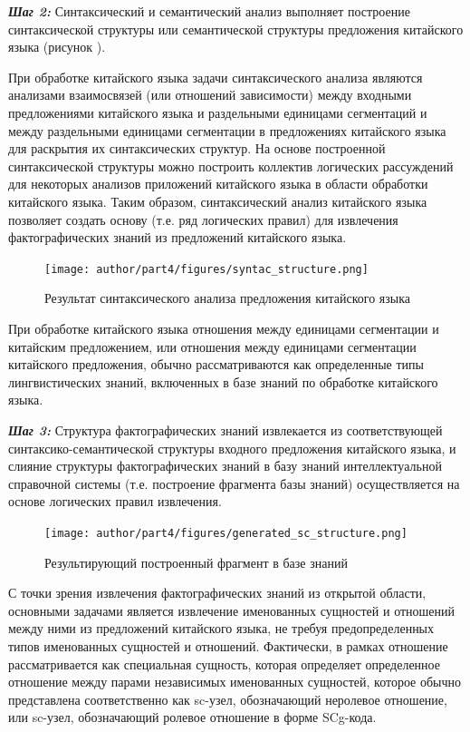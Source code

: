 \textbf{\textit{Шаг 2:}} Синтаксический и семантический анализ выполняет построение синтаксической структуры или семантической структуры предложения китайского языка (рисунок \textit{}).

При обработке китайского языка задачи синтаксического анализа являются анализами взаимосвязей (или отношений зависимости) между входными предложениями китайского языка и раздельными единицами сегментаций и между раздельными единицами сегментации в предложениях китайского языка для раскрытия их синтаксических структур. На основе построенной синтаксической структуры можно построить коллектив логических рассуждений для некоторых анализов приложений китайского языка в области обработки китайского языка. Таким образом, синтаксический анализ китайского языка позволяет создать основу (т.е. ряд логических правил) для извлечения фактографических знаний из предложений китайского языка.
\begin{figure}[H]
	\centering
	\texttt{[image: author/part4/figures/syntac\_structure.png]}
	\caption{Результат синтаксического анализа предложения китайского языка}
	\label{fig:syntac-structure}
\end{figure}

При обработке китайского языка отношения между единицами сегментации и китайским предложением, или отношения между единицами сегментации китайского предложения, обычно рассматриваются как определенные типы лингвистических знаний, включенных в базе знаний по обработке китайского языка.

\textbf{\textit{Шаг 3:}} Структура фактографических знаний извлекается из соответствующей синтаксико-семантической структуры входного предложения китайского языка, и слияние структуры фактографических знаний в базу знаний интеллектуальной справочной системы (т.е. построение фрагмента базы знаний) осуществляется на основе логических правил извлечения.


\begin{figure}[H]
	\centering
	\texttt{[image: author/part4/figures/generated\_sc\_structure.png]}
	\caption{Результирующий построенный фрагмент в базе знаний}
	\label{fig:generated-structure}
\end{figure}

С точки зрения извлечения фактографических знаний из открытой области, основными задачами является извлечение именованных сущностей и отношений между ними из предложений китайского языка, не требуя предопределенных типов именованных сущностей и отношений. Фактически, в рамках  отношение рассматривается как специальная сущность, которая определяет определенное отношение между парами независимых именованных сущностей, которое обычно представлена соответственно как sc-узел, обозначающий неролевое отношение, или sc-узел, обозначающий ролевое отношение в форме SCg-кода.

